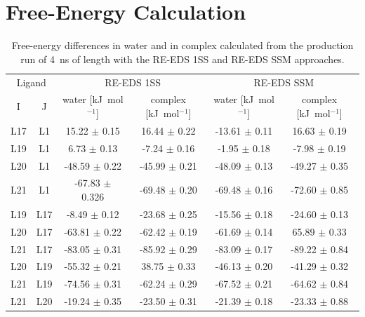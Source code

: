 \section{Free-Energy Calculation}
\begin{table}[h]
\caption{Free-energy differences in water and in complex calculated from the production run of 4~ns of length with the RE-EDS 1SS and RE-EDS SSM approaches.}
\begin{center}
\begin{tabular}{ c c |c c |c c}
  \multicolumn{2}{c|}{Ligand} & \multicolumn{2}{c|}{RE-EDS 1SS} &\multicolumn{2}{c}{RE-EDS SSM}\\ 
  I & J  & water [kJ~mol$^{-1}$] & complex [kJ~mol$^{-1}$]  & water [kJ~mol$^{-1}$] & complex [kJ~mol$^{-1}$] \\
  \hline
        L17 &         L1 &       15.22 $\pm$ 0.15&       16.44 $\pm$ 0.22&  -13.61 $\pm$ 0.11&  16.63 $\pm$ 0.19\\
        L19 &         L1 &        6.73 $\pm$ 0.13&       -7.24 $\pm$ 0.16&   -1.95 $\pm$ 0.18&  -7.98 $\pm$ 0.19\\
        L20 &         L1 &      -48.59 $\pm$ 0.22&      -45.99 $\pm$ 0.21& -48.09 $\pm$ 0.13& -49.27 $\pm$ 0.35\\
        L21 &         L1 &      -67.83 $\pm$ 0.326&     -69.48 $\pm$ 0.20& -69.48 $\pm$ 0.16& -72.60 $\pm$ 0.85\\
        L19 &         L17 &      -8.49 $\pm$ 0.12&      -23.68 $\pm$ 0.25& -15.56 $\pm$ 0.18& -24.60 $\pm$ 0.13\\
        L20 &         L17 &     -63.81 $\pm$ 0.22&      -62.42 $\pm$ 0.19& -61.69 $\pm$ 0.14&  65.89 $\pm$ 0.33\\
        L21 &         L17 &     -83.05 $\pm$ 0.31&      -85.92 $\pm$ 0.29& -83.09 $\pm$ 0.17& -89.22 $\pm$ 0.84\\
        L20 &         L19 &     -55.32 $\pm$ 0.21&       38.75 $\pm$ 0.33& -46.13 $\pm$ 0.20& -41.29 $\pm$ 0.32\\
        L21 &         L19 &     -74.56 $\pm$ 0.31&      -62.24 $\pm$ 0.29& -67.52 $\pm$ 0.21& -64.62 $\pm$ 0.84\\
        L21 &         L20 &     -19.24 $\pm$ 0.35&      -23.50 $\pm$ 0.31& -21.39 $\pm$ 0.18& -23.33 $\pm$ 0.88\\
\end{tabular}
\end{center}
\label{SItab: RE-EDS_FE_RingCycleOpening_dFs}
\end{table}


